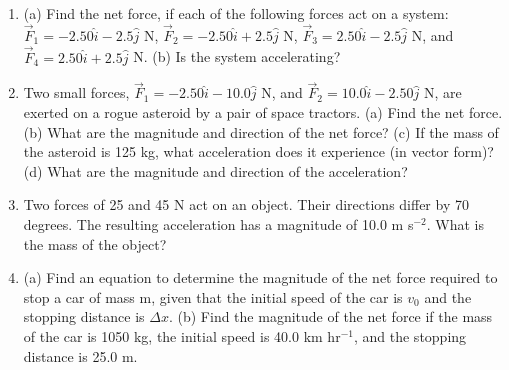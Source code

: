 \documentclass{article}
\begin{document}
\begin{enumerate}
\item (a) Find the net force, if each of the following forces act on a system: $\vec{F}_1 = -2.50\hat{i}-2.5\hat{j}$ N, $\vec{F}_2 = -2.50\hat{i}+2.5\hat{j}$ N, $\vec{F}_3 = 2.50\hat{i}-2.5\hat{j}$ N, and $\vec{F}_4 = 2.50\hat{i}+2.5\hat{j}$ N. (b) Is the system accelerating? \\ \vspace{3cm}
\item Two small forces, $\vec{F}_1 = -2.50\hat{i}-10.0\hat{j}$ N, and $\vec{F}_2 = 10.0\hat{i}-2.50\hat{j}$ N, are exerted on a rogue asteroid by a pair of space tractors. (a) Find the net force. (b) What are the magnitude and direction of the net force? (c) If the mass of the asteroid is 125 kg, what acceleration does it experience (in vector form)? (d) What are the magnitude and direction of the acceleration? \\ \vspace{3cm}
\item Two forces of 25 and 45 N act on an object. Their directions differ by 70 degrees.  The resulting acceleration has a magnitude of 10.0 m s$^{-2}$.  What is the mass of the object? \\ \vspace{3cm}
\item (a) Find an equation to determine the magnitude of the net force required to stop a car of mass m, given that the initial speed of the car is $v_0$ and the stopping distance is $\Delta x$. (b) Find the magnitude of the net force if the mass of the car is 1050 kg, the initial speed is 40.0 km hr$^{-1}$, and the stopping distance is 25.0 m.
\end{enumerate}
\end{document}
